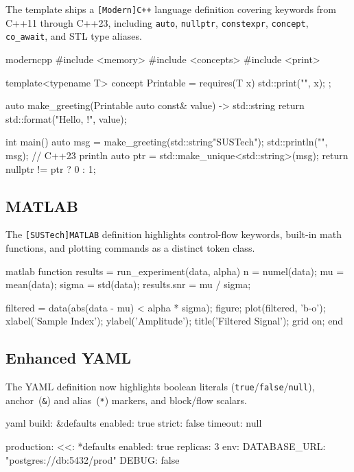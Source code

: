 \documentclass[titlepage=formal,logo=assets/校徽+中英文校名-上下.pdf,code=listings]{SUSTechHomework}
\begin{document}
The template ships a \texttt{[Modern]C++} language definition covering keywords
from C++11 through C++23, including \texttt{auto}, \texttt{nullptr},
\texttt{constexpr}, \texttt{concept}, \texttt{co\_await}, and STL type aliases.

\begin{sustechcode}{moderncpp}
#include <memory>
#include <concepts>
#include <print>

template<typename T>
concept Printable = requires(T x) { std::print("{}", x); };

auto make_greeting(Printable auto const& value) -> std::string {
    return std::format("Hello, {}!", value);
}

int main() {
    auto msg = make_greeting(std::string{"SUSTech"});
    std::println("{}", msg);     // C++23 println
    auto ptr = std::make_unique<std::string>(msg);
    return nullptr != ptr ? 0 : 1;
}
\end{sustechcode}

\subsection{MATLAB}

The \texttt{[SUSTech]MATLAB} definition highlights control-flow keywords,
built-in math functions, and plotting commands as a distinct token class.

\begin{sustechcode}{matlab}
function results = run_experiment(data, alpha)
    n = numel(data);
    mu = mean(data);
    sigma = std(data);
    results.snr = mu / sigma;

    filtered = data(abs(data - mu) < alpha * sigma);
    figure;
    plot(filtered, 'b-o');
    xlabel('Sample Index');
    ylabel('Amplitude');
    title('Filtered Signal');
    grid on;
end
\end{sustechcode}

\subsection{Enhanced YAML}

The YAML definition now highlights boolean literals (\texttt{true}/\texttt{false}/\texttt{null}),
anchor~(\texttt{\&}) and alias~(\texttt{*}) markers, and block/flow scalars.

\begin{sustechcode}{yaml}
build: &defaults
  enabled: true
  strict:  false
  timeout: null

production:
  <<: *defaults
  enabled: true
  replicas: 3
  env:
    DATABASE_URL: "postgres://db:5432/prod"
    DEBUG: false
\end{sustechcode}
\end{document}
